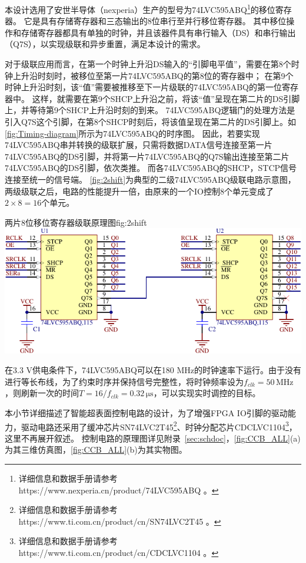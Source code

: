 \documentclass[supercite]{HustGraduPaper}
\begin{document}

本设计选用了安世半导体（nexperia）生产的型号为74LVC595ABQ\footnote{详细信息和数据手册请参考 https://www.nexperia.cn/product/74LVC595ABQ 。}的移位寄存器。
它是具有存储寄存器和三态输出的8位串行至并行移位寄存器。
其中移位操作和存储寄存器都具有单独的时钟，并且该器件具有串行输入（DS）和串行输出（Q7S），以实现级联和异步重置，满足本设计的需求。

对于级联应用而言，在第一个时钟上升沿DS输入的“引脚电平值”，需要在第8个时钟上升沿时刻时，被移位至第一片74LVC595ABQ的第8位的寄存器中；
在第9个时钟上升沿时刻，该“值”需要被推移至下一片级联的74LVC595ABQ的第一位寄存器中。
这样，就需要在第9个SHCP上升沿之前，将该“值”呈现在第二片的DS引脚上，并等待第9个SHCP上升沿时刻的到来。
74LVC595ABQ逻辑门的处理方法是引入Q7S这个引脚，在第8个SHCP时刻后，将该值呈现在第二片的DS引脚上。如\autoref{fig:Timing-diagram}所示为74LVC595ABQ的时序图。
因此，若要实现74LVC595ABQ串并转换的级联扩展，只需将数据DATA信号连接至第一片74LVC595ABQ的DS引脚，并将第一片74LVC595ABQ的Q7S输出连接至第二片74LVC595ABQ的DS引脚，依次类推。
而各74LVC595ABQ的SHCP，STCP信号连接至统一的信号端。
\autoref{fig:2shift}为典型的二级74LVC595ABQ级联电路示意图，两级级联之后，电路的性能提升一倍，由原来的一个IO控制8个单元变成了$2 \times 8 = 16$个单元。

\begin{generalfig}[htb]{两片8位移位寄存器级联原理图}{fig:2shift}
	\includegraphics[width=0.8\linewidth]{Figures/2shift.pdf}
\end{generalfig}

在3.3 V供电条件下，74LVC595ABQ可以在180 MHz的时钟速率下运行。由于没有进行等长布线，为了约束时序并保持信号完整性，将时钟频率设为$f_{clk}=50 \,\mathrm{MHz}$，则刷新一次的时间$T=16/f_{clk}=0.32 \,\mathrm{\mu s}$，可以实现实时调控的目标。


本小节详细描述了智能超表面控制电路的设计，为了增强FPGA IO引脚的驱动能力，驱动电路还采用了缓冲芯片SN74LVC2T45\footnote{详细信息和数据手册请参考 https://www.ti.com.cn/product/cn/SN74LVC2T45 。}、时钟分配芯片CDCLVC1104\footnote{详细信息和数据手册请参考 https://www.ti.com.cn/product/cn/CDCLVC1104 。}，这里不再展开叙述。
控制电路的原理图详见附录~\ref{sec:schdoc}，\autoref{fig:CCB_ALL}(a)为其三维仿真图，\autoref{fig:CCB_ALL}(b)为其实物图。
\end{document}
